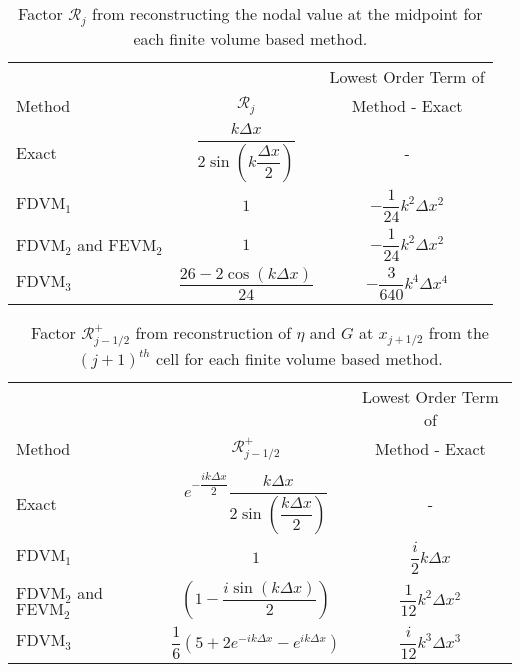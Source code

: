 \begin{table}
	\centering
	\begin{tabular}{l  c  c}
		&&Lowest Order Term of	\\
		Method& $\mathcal{R}_j$& Method - Exact  \B \\
		\hline 
		Exact &$\dfrac{k\Delta x}{2 \sin \left(k\dfrac{\Delta x}{2}\right)}$ & - \T \B \\
		$\text{FDVM}_1$ & $1$ & $-\dfrac{1}{24}k^2 \Delta x^2$ \T \B \\
		$\text{FDVM}_2$ and $\text{FEVM}_2$& $1$ & $-\dfrac{1}{24}k^2 \Delta x^2$ \T \B \\
		$\text{FDVM}_3$& $\dfrac{26 - 2 \cos\left(k \Delta x\right)}{24}$ & $-\dfrac{3}{640}k^4 \Delta x^4$ \T \B  \\
		\hline	\end{tabular}
	\caption{Factor $\mathcal{R}_j$ from reconstructing the nodal value at the midpoint for each finite volume based method.}
	\label{tab:Mfactor}
\end{table}
\begin{table}
	\centering
	\begin{tabular}{l  c  c}
		&&Lowest Order Term of	\\
		Method & $\mathcal{R}^+_{j-1/2}$ & Method - Exact \B\\
		\hline \\
		Exact & $e^{-\dfrac{ik\Delta x}{2}}\dfrac{k\Delta x}{2 \sin\left(\dfrac{k \Delta x}{2}\right)}$ & -  \\
		$\text{FDVM}_1$ & $1$ & $\dfrac{i}{2}k \Delta x$ \T\B \\
		$\text{FDVM}_2$ and $\text{FEVM}_2$& $ \left(1 - \dfrac{i \sin\left(k\Delta x \right)}{2} \right)$ & $\dfrac{1}{12}k^2 \Delta x^2$  \T\B\\
		$\text{FDVM}_3$& $\dfrac{1}{6}\left({5 + 2e^{-i k {\Delta x}} - e^{i k {\Delta x}}} \right)$ & $\dfrac{i}{12}k^3 \Delta x^3$  \T\B \\
		\hline
	\end{tabular}
	\caption{Factor $\mathcal{R}^+_{j-1/2}$ from reconstruction of $\eta$ and $G$ at $x_{j+1/2}$ from the ${(j+1)^{th}}$ cell for each finite volume based method. }
	\label{tab:Rpfactor}
\end{table}
